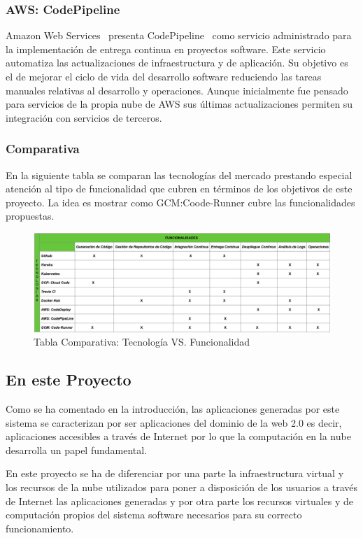 \documentclass[a4paper,11pt]{book}
\begin{document}
\subsubsection{AWS: CodePipeline}
Amazon Web Services~\cite{aws} presenta  CodePipeline~\cite{awspipe} como servicio administrado para la implementación de entrega continua en proyectos software. Este servicio automatiza las actualizaciones de infraestructura y de aplicación. Su objetivo es el de mejorar el ciclo de vida del desarrollo software reduciendo las tareas manuales relativas al desarrollo y operaciones. Aunque inicialmente fue pensado para servicios de la propia nube de AWS sus últimas actualizaciones permiten su integración con servicios de terceros.  


\subsubsection{Comparativa}

En la siguiente tabla se comparan las tecnologías del mercado prestando especial atención al tipo de funcionalidad que cubren en términos de los objetivos de este proyecto. La idea es mostrar como GCM:Coode-Runner cubre las funcionalidades propuestas.

\begin{figure}[H]
\centering
\includegraphics[scale=0.30]{imagenes/comparativa.png}
\caption{ Tabla Comparativa: Tecnología VS. Funcionalidad }
\end{figure}


\subsection{En este Proyecto}

Como se ha comentado en la introducción, las aplicaciones generadas por este sistema se caracterizan por ser aplicaciones del dominio de la web 2.0 es decir, aplicaciones accesibles a través de Internet por lo que la computación en la nube desarrolla un papel fundamental. 

En este proyecto se ha de diferenciar por una parte la infraestructura virtual y los recursos de la nube utilizados para poner a disposición de los usuarios  a través de Internet las aplicaciones generadas y por otra parte los recursos virtuales y de computación propios del sistema software necesarios para su correcto funcionamiento. 
\end{document}
